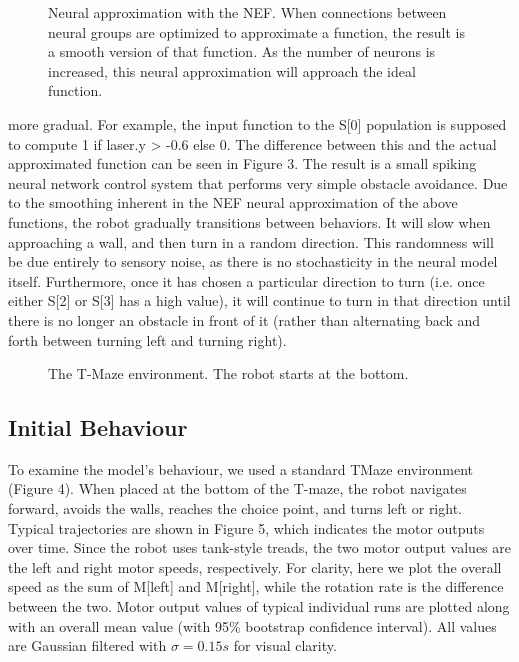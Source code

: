 \documentclass[conference]{IEEEtran}
\begin{document}
\begin{figure}[!t]
\label{NEF}
\centering
\caption{Neural approximation with the NEF. When connections between neural groups are optimized to approximate a function, the result is a smooth version of that function. As the number of neurons is increased, this neural approximation will approach the ideal function.}
\end{figure}

more gradual. For example, the input function to the S[0]
population is supposed to compute 1 if laser.y > -0.6
else 0. The difference between this and the actual
approximated function can be seen in Figure 3.
The result is a small spiking neural network control
system that performs very simple obstacle avoidance. Due
to the smoothing inherent in the NEF neural approximation
of the above functions, the robot gradually transitions
between behaviors. It will slow when approaching a wall,
and then turn in a random direction. This randomness will
be due entirely to sensory noise, as there is no stochasticity
in the neural model itself. Furthermore, once it has chosen
a particular direction to turn (i.e. once either S[2] or S[3] has a high value), it will continue to turn in that direction
until there is no longer an obstacle in front of it (rather than alternating back and forth between turning left and turning right).

\begin{figure}[!t]
\label{Tmaze}
\centering
\caption{The T-Maze environment. The robot starts at the bottom.}
\end{figure}

\subsection{Initial Behaviour}

To examine the model's behaviour, we used a standard TMaze
environment (Figure 4). When placed at the bottom
of the T-maze, the robot navigates forward, avoids the
walls, reaches the choice point, and turns left or right.
Typical trajectories are shown in Figure 5, which indicates
the motor outputs over time. Since the robot uses tank-style
treads, the two motor output values are the left and right
motor speeds, respectively. For clarity, here we plot the
overall speed as the sum of M[left] and M[right], while
the rotation rate is the difference between the two. Motor output values of typical individual runs are plotted along
with an overall mean value (with 95\% bootstrap confidence
interval). All values are Gaussian filtered with $\sigma=0.15s$ for visual clarity.
\end{document}
